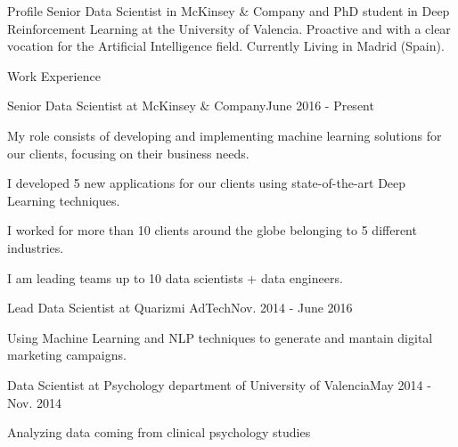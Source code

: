 \documentclass{resume} %
\begin{document}
  
\begin{rSection}{Profile}
Senior Data Scientist in McKinsey \& Company and PhD student in Deep Reinforcement Learning at the University of Valencia. Proactive and with a clear vocation for the Artificial Intelligence field. Currently Living in Madrid (Spain).
\end{rSection}



\begin{rSection}{ Work Experience } \itemsep -1pt       
\begin{rSubsection}{Senior Data Scientist at McKinsey \& Company}{June 2016 - Present}{}    
    
    \vspace{-3pt}
    
    \item My role consists of developing and implementing machine learning solutions for our clients, focusing on their business needs.
    \item I developed 5 new applications for our clients using state-of-the-art Deep Learning techniques.
    \item I worked for more than 10 clients around the globe belonging to 5 different industries.
    \item I am leading teams up to 10 data scientists + data engineers.
\end{rSubsection} 

\vspace{-6pt}

\begin{rSubsection}{Lead Data Scientist at Quarizmi AdTech}{Nov. 2014 - June 2016}{}
    
    \vspace{-3pt}
    
    \item Using Machine Learning and NLP techniques to generate and mantain digital marketing campaigns.
\end{rSubsection} 

\vspace{-6pt}

\begin{rSubsection}{Data Scientist at Psychology department of University of Valencia}{May 2014 - Nov. 2014}{}

    \vspace{-3pt}
    
    \item Analyzing data coming from clinical psychology studies 


\end{rSubsection}
\end{rSection}
\end{document}
